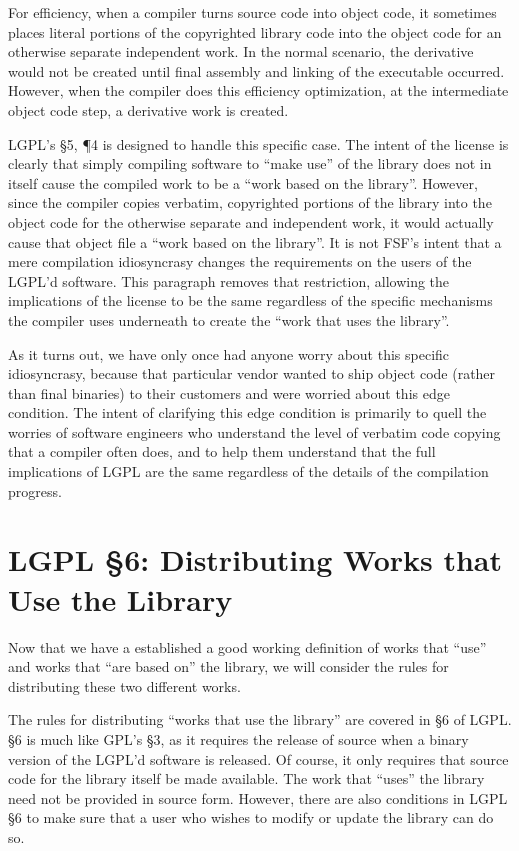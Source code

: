 \documentclass[12pt]{report}
\begin{document}
For efficiency, when a compiler turns source code into object code, it
sometimes places literal portions of the copyrighted library code into the
object code for an otherwise separate independent work.  In the normal
scenario, the derivative would not be created until final assembly and
linking of the executable occurred.  However, when the compiler does this
efficiency optimization, at the intermediate object code step, a
derivative work is created.

LGPL's \S 5, \P 4 is designed to handle this specific case.  The intent of
the license is clearly that simply compiling software to ``make use'' of
the library does not in itself cause the compiled work to be a ``work
based on the library''.  However, since the compiler copies verbatim,
copyrighted portions of the library into the object code for the otherwise
separate and independent work, it would actually cause that object file a
``work based on the library''.  It is not FSF's intent that a mere
compilation idiosyncrasy changes the requirements on the users of the
LGPL'd software.  This paragraph removes that restriction, allowing the
implications of the license to be the same regardless of the specific
mechanisms the compiler uses underneath to create the ``work that uses the
library''.

As it turns out, we have only once had anyone worry about this specific
idiosyncrasy, because that particular vendor wanted to ship object code
(rather than final binaries) to their customers and were worried about
this edge condition.  The intent of clarifying this edge condition is
primarily to quell the worries of software engineers who understand the
level of verbatim code copying that a compiler often does, and to help
them understand that the full implications of LGPL are the same regardless
of the details of the compilation progress.

\section{LGPL \S 6: Distributing Works that Use the Library}

Now that we have a established a good working definition of works that
``use'' and works that ``are based on'' the library, we will consider the
rules for distributing these two different works.

The rules for distributing ``works that use the library'' are covered in
\S 6 of LGPL\@.  \S 6 is much like GPL's \S 3, as it requires the release
of source when a binary version of the LGPL'd software is released.  Of
course, it only requires that source code for the library itself be made
available.  The work that ``uses'' the library need not be provided in
source form.  However, there are also conditions in LGPL \S 6 to make sure
that a user who wishes to modify or update the library can do so.
\end{document}
